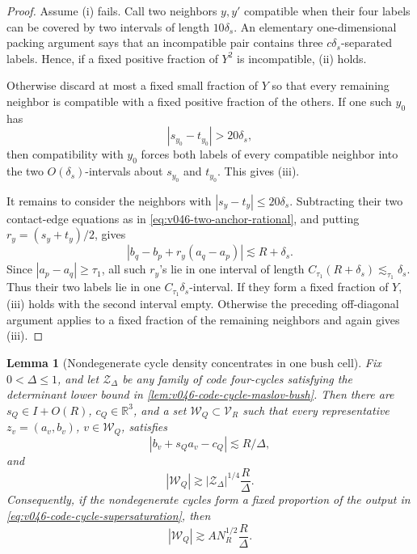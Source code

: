 \documentclass[10pt]{article}
\newtheorem{lemma}[theorem]{Lemma}
\newcommand{\R}{\mathbb R}
\begin{document}
\begin{proof}
Assume (i) fails.  Call two neighbors \(y,y'\) compatible when their four labels can be covered by
two intervals of length \(10\delta_s\).  An elementary one-dimensional packing argument says that
an incompatible pair contains three \(c\delta_s\)-separated labels.  Hence, if a fixed positive
fraction of \(Y^2\) is incompatible, (ii) holds.

Otherwise discard at most a fixed small fraction of \(Y\) so that every remaining neighbor is
compatible with a fixed positive fraction of the others.  If one such \(y_0\) has
\[
|s_{y_0}-t_{y_0}|>20\delta_s,
\]
then compatibility with \(y_0\) forces both labels of every compatible neighbor into the two
\(O(\delta_s)\)-intervals about \(s_{y_0}\) and \(t_{y_0}\).  This gives (iii).

It remains to consider the neighbors with
\(|s_y-t_y|\le20\delta_s\).  Subtracting their two contact-edge equations as in
\eqref{eq:v046-two-anchor-rational}, and putting \(r_y=(s_y+t_y)/2\), gives
\[
|b_q-b_p+r_y(a_q-a_p)|
\lesssim R+\delta_s.
\]
Since \(|a_p-a_q|\ge\tau_1\), all such \(r_y\)'s lie in one interval of length
\(C_{\tau_1}(R+\delta_s)\lesssim_{\tau_1}\delta_s\).  Thus their two labels lie in one
\(C_{\tau_1}\delta_s\)-interval.  If they form a fixed fraction of \(Y\), (iii) holds with the
second interval empty.  Otherwise the preceding off-diagonal argument applies to a fixed fraction
of the remaining neighbors and again gives (iii).
\end{proof}

\begin{lemma}[Nondegenerate cycle density concentrates in one bush cell]
\label{lem:v046-cycle-bush-cell-aggregation}
Fix \(0<\Delta\le1\), and let \(\mathcal Z_\Delta\) be any family of code four-cycles satisfying the
determinant lower bound in \cref{lem:v046-code-cycle-maslov-bush}.  Then there are
\(s_Q\in I+O(R)\), \(c_Q\in\R^3\), and a set \(\mathscr W_Q\subset\mathscr V_R\) such that every
representative \(z_v=(a_v,b_v)\), \(v\in\mathscr W_Q\), satisfies
\[
|b_v+s_Qa_v-c_Q|
\lesssim R/\Delta,
\]
and
\begin{equation}
\label{eq:v046-cycle-bush-cell-vertices}
\boxed{
|\mathscr W_Q|
\gtrsim
|\mathcal Z_\Delta|^{1/4}\frac{R}{\Delta}.
}
\end{equation}
Consequently, if the nondegenerate cycles form a fixed proportion of the output in
\eqref{eq:v046-code-cycle-supersaturation}, then
\begin{equation}
\label{eq:v046-cycle-bush-cell-power}
\boxed{
|\mathscr W_Q|
\gtrsim
A N_R^{1/2}\frac{R}{\Delta}.
}
\end{equation}
\end{lemma}
\end{document}
